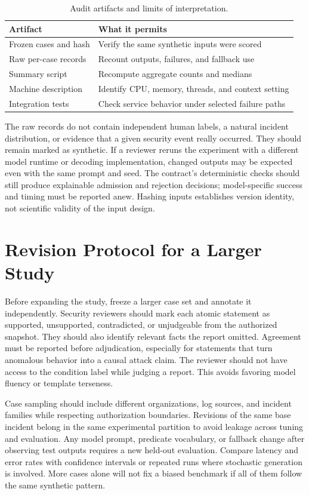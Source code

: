 \begin{table}[t]
\centering\caption{Audit artifacts and limits of interpretation.}
\label{tab:artifacts}
\begin{tabular}{p{}p{}}
\hline
Artifact & What it permits\\\hline
Frozen cases and hash & Verify the same synthetic inputs were scored\\
Raw per-case records & Recount outputs, failures, and fallback use\\
Summary script & Recompute aggregate counts and medians\\
Machine description & Identify CPU, memory, threads, and context setting\\
Integration tests & Check service behavior under selected failure paths\\\hline
\end{tabular}
\end{table}

The raw records do not contain independent human labels, a natural incident distribution, or evidence that a given security event really occurred. They should remain marked as synthetic. If a reviewer reruns the experiment with a different model runtime or decoding implementation, changed outputs may be expected even with the same prompt and seed. The contract's deterministic checks should still produce explainable admission and rejection decisions; model-specific success and timing must be reported anew. Hashing inputs establishes version identity, not scientific validity of the input design.

\section{Revision Protocol for a Larger Study}
Before expanding the study, freeze a larger case set and annotate it independently. Security reviewers should mark each atomic statement as supported, unsupported, contradicted, or unjudgeable from the authorized snapshot. They should also identify relevant facts the report omitted. Agreement must be reported before adjudication, especially for statements that turn anomalous behavior into a causal attack claim. The reviewer should not have access to the condition label while judging a report. This avoids favoring model fluency or template terseness.

Case sampling should include different organizations, log sources, and incident families while respecting authorization boundaries. Revisions of the same base incident belong in the same experimental partition to avoid leakage across tuning and evaluation. Any model prompt, predicate vocabulary, or fallback change after observing test outputs requires a new held-out evaluation. Compare latency and error rates with confidence intervals or repeated runs where stochastic generation is involved. More cases alone will not fix a biased benchmark if all of them follow the same synthetic pattern.

